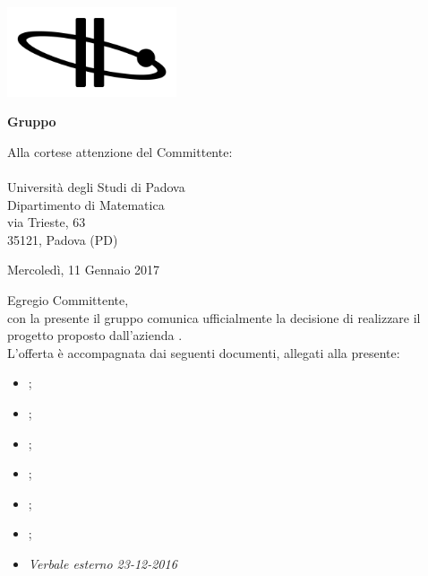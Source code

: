   
	\begin{titlepage}
	
	\begin{center}
	 	
	\includegraphics[width=5cm]{../../modello/or-bit_bkg_minBorder.png} 
	\begin{Huge} 
	 	\textbf{Gruppo \GroupName{}}
	\end{Huge}
	\end{center}
	
	\vspace{1cm}
	\begin{large}
	\begin{flushright}
		Alla cortese attenzione del Committente: \\
		\Committente \\
		Università degli Studi di Padova \\
		Dipartimento di Matematica \\
		via Trieste, 63 \\
		35121, Padova (PD) 
		
		\vspace{0,5cm}
		
		Mercoledì, 11 Gennaio 2017
	\end{flushright}

	\vspace{1cm}
	
	Egregio Committente, \\
	con la presente il gruppo \GroupName{} comunica ufficialmente la decisione di realizzare il progetto \ProjectName{} proposto dall'azienda \Proponente{}.\\
	
	
	L'offerta è accompagnata dai seguenti documenti, allegati alla presente:
	\begin{itemize}
		\item \AnalisiDeiRequisiti{};
		\item \Glossario{};
		\item \NormeDiProgetto{};
		\item \PianoDiProgetto{};
		\item \PianoDiQualifica{};
		\item \StudioDiFattibilita{};
		\item \emph{Verbale esterno 23-12-2016}
	\end{itemize}
	

\end{large}
\end{titlepage}
